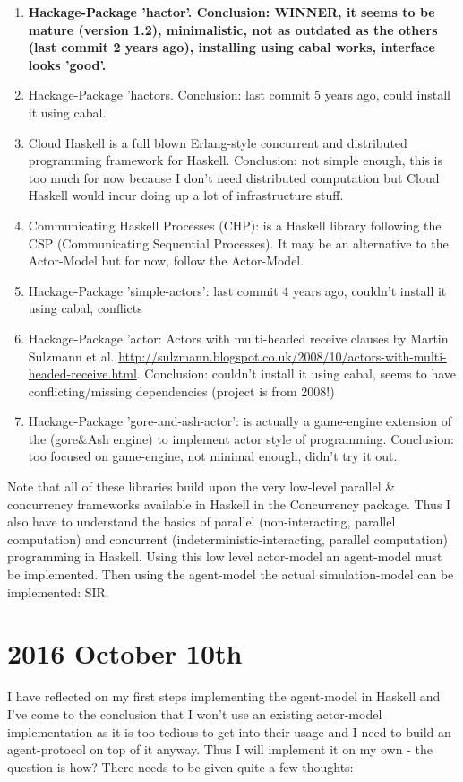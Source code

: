 \begin{enumerate}
\item \textbf{Hackage-Package 'hactor'. Conclusion: WINNER, it seems to be mature (version 1.2), minimalistic, not as outdated as the others (last commit 2 years ago), installing using cabal works, interface looks 'good'.}
\item Hackage-Package 'hactors. Conclusion: last commit 5 years ago, could install it using cabal.
\item Cloud Haskell is a full blown Erlang-style concurrent and distributed programming framework for Haskell. Conclusion: not simple enough, this is too much for now because I don't need distributed computation but Cloud Haskell would incur doing up a lot of infrastructure stuff.
\item Communicating Haskell Processes (CHP): is a Haskell library following the CSP (Communicating Sequential Processes). It may be an alternative to the Actor-Model but for now, follow the Actor-Model.
\item Hackage-Package 'simple-actors': last commit 4 years ago, couldn't install it using cabal, conflicts
\item Hackage-Package 'actor: Actors with multi-headed receive clauses by Martin Sulzmann et al. \url{http://sulzmann.blogspot.co.uk/2008/10/actors-with-multi-headed-receive.html}. Conclusion: couldn't install it using cabal, seems to have conflicting/missing dependencies (project is from 2008!)
\item Hackage-Package 'gore-and-ash-actor': is actually a game-engine extension of the (gore\&Ash engine) to implement actor style of programming. Conclusion: too focused on game-engine, not minimal enough, didn't try it out.
\end{enumerate}

Note that all of these libraries build upon the very low-level parallel \& concurrency frameworks available in Haskell in the Concurrency package. Thus I also have to understand the basics of parallel (non-interacting, parallel computation) and concurrent (indeterministic-interacting, parallel computation) programming in Haskell. Using this low level actor-model an agent-model must be implemented. Then using the agent-model the actual simulation-model can be implemented: SIR.

\section*{2016 October 10th}
I have reflected on my first steps implementing the agent-model in Haskell and I've come to the conclusion that I won't use an existing actor-model implementation as it is too tedious to get into their usage and I need to build an agent-protocol on top of it anyway. Thus I will implement it on my own - the question is how? There needs to be given quite a few thoughts:

